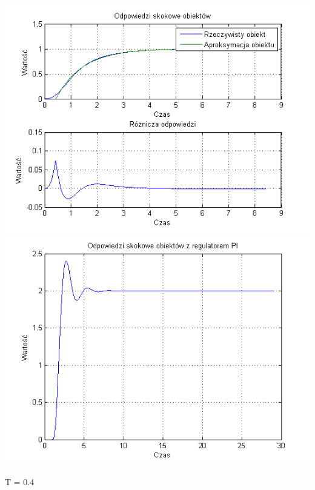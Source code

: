 \documentclass[10pt,a4paper]{article}
\begin{document}
\begin{center}
\includegraphics[scale=1]{images/jeden/skrypt_251.png}\\
\includegraphics[scale=1]{images/jeden/skrypt_252.png}\\
\end{center}
\newpage
T = 0.4
\end{document}
